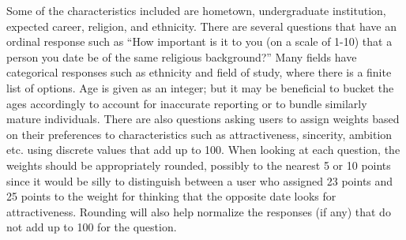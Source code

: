 \documentclass{article}
\begin{document}
Some of the characteristics included are hometown, undergraduate institution, expected career, religion, and ethnicity.  There are several questions that have an ordinal response such as “How important is it to you (on a scale of 1-10) that a person you date be of the same religious background?”  Many fields have categorical responses such as ethnicity and field of study, where there is a finite list of options.  Age is given as an integer; but it may be beneficial to bucket the ages accordingly to account for inaccurate reporting or to bundle similarly mature individuals. There are also questions asking users to assign weights based on their preferences to characteristics such as attractiveness, sincerity, ambition etc. using discrete values that add up to 100.  When looking at each question, the weights should be appropriately rounded, possibly to the nearest 5 or 10 points since it would be silly to distinguish between a user who assigned 23 points and 25 points to the weight for thinking that the opposite date looks for attractiveness.  Rounding will also help normalize the responses (if any) that do not add up to 100 for the question.\\
\end{document}
